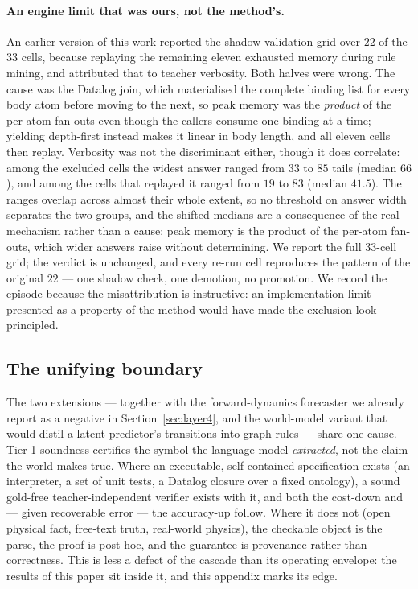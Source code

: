 \documentclass[11pt]{article}
\theoremstyle{plain}
\begin{document}
\paragraph{An engine limit that was ours, not the method's.} An earlier version of
this work reported the shadow-validation grid over $22$ of the $33$ cells, because
replaying the remaining eleven exhausted memory during rule mining, and attributed
that to teacher verbosity. Both halves were wrong. The cause was the Datalog join,
which materialised the complete binding list for every body atom before moving to
the next, so peak memory was the \emph{product} of the per-atom fan-outs even
though the callers consume one binding at a time; yielding depth-first instead
makes it linear in body length, and all eleven cells then replay. Verbosity was
not the discriminant either, though it does correlate: among the excluded cells
the widest answer ranged from $33$ to $85$ tails (median $66$), and among the
cells that replayed it ranged from $19$ to $83$ (median $41.5$). The ranges
overlap across almost their whole extent, so no threshold on answer width
separates the two groups, and the shifted medians are a consequence of the real
mechanism rather than a cause: peak memory is the product of the per-atom
fan-outs, which wider answers raise without determining.
We report the full $33$-cell grid; the
verdict is unchanged, and every re-run cell reproduces the pattern of the original
$22$ --- one shadow check, one demotion, no promotion. We record the episode
because the misattribution is instructive: an implementation limit presented as a
property of the method would have made the exclusion look principled.

\subsection{The unifying boundary}
The two extensions --- together with the forward-dynamics forecaster we
already report as a negative in Section~\ref{sec:layer4}, and the
world-model variant that would distil a latent predictor's transitions
into graph rules \citep{zhou2025walle2,liu2026gwmtaxonomy} --- share one
cause. Tier-1
soundness certifies the symbol the language model \emph{extracted}, not
the claim the world makes true. Where an executable, self-contained
specification exists (an interpreter, a set of unit tests, a Datalog
closure over a fixed ontology), a sound gold-free teacher-independent
verifier exists with it, and both the cost-down and --- given recoverable
error --- the accuracy-up follow. Where it does not (open physical fact,
free-text truth, real-world physics), the checkable object is the parse,
the proof is post-hoc, and the guarantee is provenance rather than
correctness. This is less a defect of the cascade than its operating
envelope: the results of this paper sit inside it, and this appendix marks
its edge.
\end{document}
